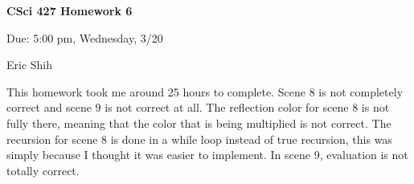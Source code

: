 \documentclass[11pt]{article}
\begin{document}
\begin{LARGE}
\centerline {\bf CSci 427 Homework 6}
\end{LARGE}
\vskip 0.25cm

\centerline{Due: 5:00 pm, Wednesday, 3/20}
\centerline{Eric Shih}

\setlength{\parindent}{1cm}
 \indent This homework took me around 25 hours to complete. Scene 8 is not completely correct and scene 9 is not correct at all. The
 reflection color for scene 8 is not fully there, meaning that the color that is being multiplied is not correct. The recursion
 for scene 8 is done in a while loop instead of true recursion, this was simply because I thought it was easier to implement.
 In scene 9, evaluation is not totally correct.
\end{document}
